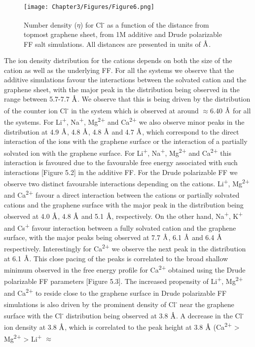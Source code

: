 \begin{figure}
    \centering
    \texttt{[image: Chapter3/Figures/Figure6.png]}
    \caption[Number density ($\eta$) for Cl\textsuperscript{-} as a function of the distance from topmost graphene sheet, from 1M additive and Drude polarizable FF salt simulations]{Number density ($\eta$) for  Cl\textsuperscript{-} as a function of the distance from topmost graphene sheet, from 1M additive and Drude polarizable FF salt simulations. All distances are presented in units of $\text{\normalfont\AA}$.}
\end{figure}

The ion density distribution for the cations depends on both the size of the cation as well as the underlying FF. For all the systems we observe that the additive simulations favour the interactions between the solvated cation and the graphene sheet, with the major peak in the distribution being observed in the range between 5.7-7.7 $\text{\normalfont\AA}$. We observe that this is being driven by the distribution of the counter ion Cl\textsuperscript{-} in the system which is observed at around $\approx$6.40 $\text{\normalfont\AA}$ for all the systems. For Li\textsuperscript{+}, Na\textsuperscript{+}, Mg\textsuperscript{2+} and Ca\textsuperscript{2+} we also observe minor peaks in the distribution at 4.9 $\text{\normalfont\AA}$, 4.8 $\text{\normalfont\AA}$, 4.8 $\text{\normalfont\AA}$ and 4.7 $\text{\normalfont\AA}$, which correspond to the direct interaction of the ions with the graphene surface or the interaction of a partially solvated ion with the graphene surface. For Li\textsuperscript{+}, Na\textsuperscript{+}, Mg\textsuperscript{2+} and Ca\textsuperscript{2+} this interaction is favoured due to the favourable free energy associated with such interactions [Figure 5.2] in the additive FF. For the Drude polarizable FF we observe two distinct favourable interactions depending on the cations. Li\textsuperscript{+}, Mg\textsuperscript{2+} and Ca\textsuperscript{2+} favour a direct interaction between the cations or partially solvated cations and the graphene surface with the major peak in the distribution being observed at 4.0 $\text{\normalfont\AA}$, 4.8 $\text{\normalfont\AA}$ and 5.1 $\text{\normalfont\AA}$, respectively. On the other hand, Na\textsuperscript{+}, K\textsuperscript{+} and Cs\textsuperscript{+} favour interaction between a fully solvated cation and the graphene surface, with the major peaks being observed at 7.7 $\text{\normalfont\AA}$, 6.1 $\text{\normalfont\AA}$ and 6.4 $\text{\normalfont\AA}$ respectively. Interestingly for Ca\textsuperscript{2+} we observe the next peak in the distribution at 6.1 $\text{\normalfont\AA}$. This close pacing of the peaks is correlated to the broad shallow minimum observed in the free energy profile for Ca\textsuperscript{2+} obtained using the Drude polarizable FF parameters [Figure 5.3]. The increased propensity of Li\textsuperscript{+}, Mg\textsuperscript{2+} and Ca\textsuperscript{2+} to reside close to the graphene surface in Drude polarizable FF simulations is also driven by the prominent density of Cl\textsuperscript{-} near the graphene surface with the Cl\textsuperscript{-} distribution being observed at 3.8 $\text{\normalfont\AA}$. A decrease in the Cl\textsuperscript{-} ion density at 3.8 $\text{\normalfont\AA}$, which is correlated to the peak height at 3.8 $\text{\normalfont\AA}$ (Ca\textsuperscript{2+} > Mg\textsuperscript{2+} > Li\textsuperscript{+} $\approx$ 